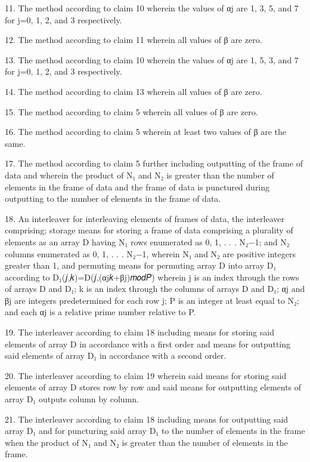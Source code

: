 \documentclass[11pt,a4paper]{article}
\begin{document}
11. The method according to claim 10 wherein the values of αj are 1, 3, 5, and 7 for j=0, 1, 2, and 3 respectively.

12. The method according to claim 11 wherein all values of β are zero.

13. The method according to claim 10 wherein the values of αj are 1, 5, 3, and 7 for j=0, 1, 2, and 3 respectively.

14. The method according to claim 13 wherein all values of β are zero.

15. The method according to claim 5 wherein all values of β are zero.

16. The method according to claim 5 wherein at least two values of β are the same.

17. The method according to claim 5 further including outputting of the frame of data and wherein the product of N₁ and N₂ is greater than the number of elements in the frame of data and the frame of data is punctured during outputting to the number of elements in the frame of data.

18. An interleaver for interleaving elements of frames of data, the interleaver comprising; storage means for storing a frame of data comprising a plurality of elements as an array D having N₁ rows enumerated as 0, 1, . . . N₂−1; and N₂ columns enumerated as 0, 1, . . . N₂−1, wherein N₁ and N₂ are positive integers greater than 1, and permuting means for permuting array D into array D₁ according to D₁(𝑗,𝑘)=D(𝑗,(αj𝑘+βj)𝑚𝑜𝑑𝑃)  wherein j is an index through the rows of arrays D and D₁; k is an index through the columns of arrays D and D₁; αj and βj are integers predetermined for each row j; P is an integer at least equal to N₂; and each αj is a relative prime number relative to P.

19. The interleaver according to claim 18 including means for storing said elements of array D in accordance with a first order and means for outputting said elements of array D₁ in accordance with a second order.

20. The interleaver according to claim 19 wherein said means for storing said elements of array D stores row by row and said means for outputting elements of array D₁ outputs column by column.

21. The interleaver according to claim 18 including means for outputting said array D₁ and for puncturing said array D₁ to the number of elements in the frame when the product of N₁ and N₂ is greater than the number of elements in the frame.
\end{document}
